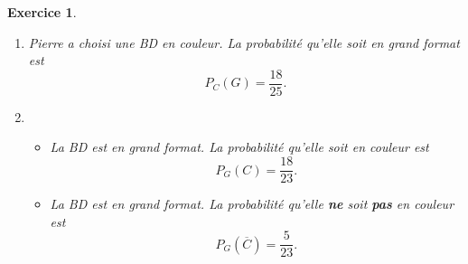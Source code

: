 \documentclass[10pt]{article}
\newtheorem{exo}{Exercice}
\begin{document}
\begin{exo}
\begin{enumerate}
\begin{enumerate}
\begin{itemize}
C'est le cas de toutes les BD (!), car il n'y en a aucune en N\&B et en petit format. Conclusion~: 
\[P(C\cup G)=\frac{30}{30}=1.\]
\end{itemize}
\item Pierre a choisi une BD en couleur. La probabilité qu'elle soit en grand format est \[P_C(G)=\frac{18}{25}.\]
\item \begin{itemize}
\item[\textbullet] La BD est en grand format. La probabilité qu'elle soit en couleur est
\[P_G(C)=\frac{18}{23}.\]
\item[\textbullet] La BD est en grand format. La probabilité qu'elle \textbf{ne} soit \textbf{pas} en couleur est
\[P_G\left(\overline{C}\right)=\frac{5}{23}.\]
\end{itemize}
\end{enumerate}
\end{enumerate}

\end{exo}
\end{document}
